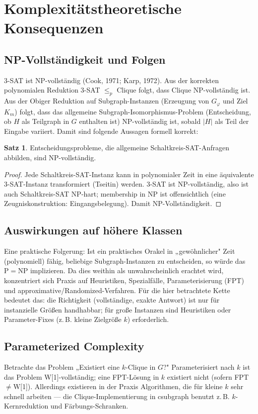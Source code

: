 \documentclass[a4paper,12pt]{article}
\theoremstyle{definition}
\newtheorem{satz}{Satz}[section]
\begin{document}
\section{Komplexitätstheoretische Konsequenzen}
\label{ch:complexity}

\subsection{NP-Vollständigkeit und Folgen}
3-SAT ist NP-vollständig (Cook, 1971; Karp, 1972). Aus der korrekten polynomialen Reduktion 3-SAT $\le_p$ Clique folgt, dass Clique NP-vollständig ist. Aus der Obiger Reduktion auf Subgraph-Instanzen (Erzeugung von $G_\varphi$ und Ziel $K_m$) folgt, dass das allgemeine Subgraph-Isomorphismus-Problem (Entscheidung, ob $H$ als Teilgraph in $G$ enthalten ist) NP-vollständig ist, sobald $|H|$ als Teil der Eingabe variiert. Damit sind folgende Aussagen formell korrekt:

\begin{satz}
Entscheidungsprobleme, die allgemeine Schaltkreis-SAT-Anfragen abbilden, sind NP-vollständig.
\end{satz}
\begin{proof}
Jede Schaltkreis-SAT-Instanz kann in polynomialer Zeit in eine äquivalente 3-SAT-Instanz transformiert (Tseitin) werden. 3-SAT ist NP-vollständig, also ist auch Schaltkreis-SAT NP-hart; membership in NP ist offensichtlich (eine Zeugniskonstruktion: Eingangsbelegung). Damit NP-Vollständigkeit.
\end{proof}

\subsection{Auswirkungen auf höhere Klassen}
Eine praktische Folgerung: Ist ein praktisches Orakel in „gewöhnlicher" Zeit (polynomiell) fähig, beliebige Subgraph-Instanzen zu entscheiden, so würde das $ \mathrm{P} = \mathrm{NP}$ implizieren. Da dies weithin als unwahrscheinlich erachtet wird, konzentriert sich Praxis auf Heuristiken, Spezialfälle, Parameterisierung (FPT) und approximative/Randomized-Verfahren. Für die hier betrachtete Kette bedeutet das: die Richtigkeit (vollständige, exakte Antwort) ist nur für instanzielle Größen handhabbar; für große Instanzen sind Heuristiken oder Parameter-Fixes (z.\,B. kleine Zielgröße $k$) erforderlich.

\subsection{Parameterized Complexity}
Betrachte das Problem „Existiert eine $k$-Clique in $G$?" Parameterisiert nach $k$ ist das Problem W[1]-vollständig; eine FPT-Lösung in $k$ existiert nicht (sofern FPT$\neq$W[1]). Allerdings existieren in der Praxis Algorithmen, die für kleine $k$ sehr schnell arbeiten — die Clique-Implementierung in csubgraph benutzt z.\,B. $k$-Kernreduktion und Färbungs-Schranken.
\end{document}
